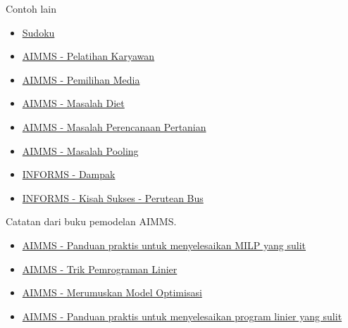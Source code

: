 \begin{resource}
{Contoh lain}
\begin{itemize}
\item \href{https://www.juliaopt.org/notebooks/JuMP-Sudoku.html}{Sudoku}
\item \href{https://download.aimms.com/aimms/download/manuals/AIMMS3OM_EmployeeTraining.pdf}{AIMMS - Pelatihan Karyawan}

\item \href{https://download.aimms.com/aimms/download/manuals/AIMMS3OM_MediaSelection.pdf}{AIMMS - Pemilihan Media}

\item \href{https://download.aimms.com/aimms/download/manuals/AIMMS3OM_Diet.pdf}{AIMMS - Masalah Diet}

\item \href{https://download.aimms.com/aimms/download/manuals/AIMMS3OM_FarmPlanning.pdf}{AIMMS - Masalah Perencanaan Pertanian}

\item \href{https://download.aimms.com/aimms/download/manuals/AIMMS3OM_Pooling.pdf}{AIMMS - Masalah Pooling}

\item \href{https://www.informs.org/Impact}{INFORMS - Dampak}
\item \href{https://www.informs.org/Impact/O.R.-Analytics-Success-Stories/Optimized-school-bus-routing-helps-school-districts-design-better-policies}{INFORMS - Kisah Sukses - Perutean Bus}
\end{itemize}

{Catatan dari buku pemodelan AIMMS.}
\begin{itemize}

\item \href{http://inside.mines.edu/~anewman/MIP_practice120212.pdf}{AIMMS - Panduan praktis untuk menyelesaikan MILP yang sulit}

\item \href{https://download.aimms.com/aimms/download/manuals/AIMMS3OM_LinearProgrammingTricks.pdf}{AIMMS - Trik Pemrograman Linier}


\item \href{https://download.aimms.com/aimms/download/manuals/AIMMS3OM_FormulatingOptimizationModels.pdf}{AIMMS - Merumuskan Model Optimisasi}


\item \href{https://pdfs.semanticscholar.org/b01f/ad44c20c372fdda95cbfb980c0d37302de07.pdf}{AIMMS - Panduan praktis untuk menyelesaikan program linier yang sulit}
\end{itemize}


\end{resource}
